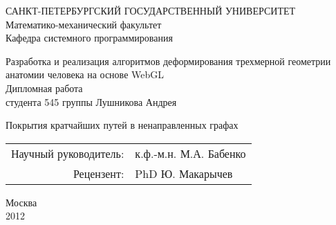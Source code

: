 \thispagestyle{empty}
\begin{center}
САНКТ-ПЕТЕРБУРГСКИЙ ГОСУДАРСТВЕННЫЙ УНИВЕРСИТЕТ\\
Математико-механический факультет\\
Кафедра системного программирования\\
\end{center}
\vspace{2cm}
\begin{center}
    \Large{Разработка и реализация алгоритмов деформирования трехмерной геометрии
 анатомии человека на основе WebGL} \\
    {\Large Дипломная работа}\\
    студента 545 группы
    Лушникова Андрея
\end{center}
\vspace{1cm}
\begin{center}
    {\Large Покрытия кратчайших путей в ненаправленных графах}
\end{center}
\vspace{3cm}
\begin{flushright}
    \begin{tabular}{rl}
        Научный руководитель: & к.ф.-м.н. М.А. Бабенко\\
        Рецензент: & PhD Ю. Макарычев
    \end{tabular}
\end{flushright}
\vspace{\fill}
\begin{center}
    Москва\\2012
\end{center}
\pagebreak
